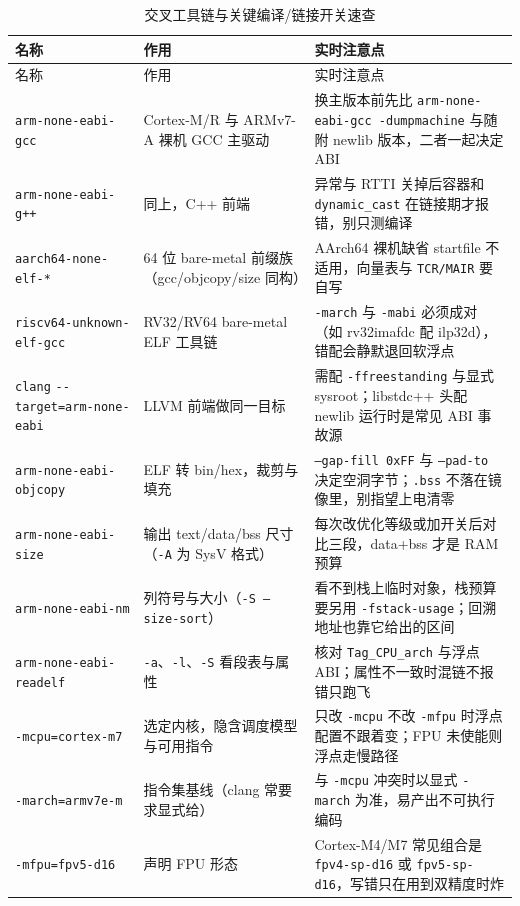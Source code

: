 \documentclass[12pt,a4paper,fontset=fandol]{ctexbook}
\newcommand{\Tp}[1]{\texttt{#1}}
\newcommand{\Opt}[1]{\texttt{-\/-#1}}
\begin{document}
\begin{longtable}{>{\raggedright\arraybackslash\footnotesize}p{} >{\raggedright\arraybackslash\footnotesize}p{} >{\raggedright\arraybackslash\footnotesize}p{}}
\caption{交叉工具链与关键编译/链接开关速查}\label{tab:apB-toolchain} \\
\toprule 名称 & 作用 & 实时注意点 \\ \midrule
\endfirsthead
\toprule 名称 & 作用 & 实时注意点 \\ \midrule
\endhead
\bottomrule \endfoot
\endlastfoot
\Tp{arm-none-eabi-gcc} & Cortex-M/R 与 ARMv7-A 裸机 GCC 主驱动 & 换主版本前先比 \Tp{arm-none-eabi-gcc -dumpmachine} 与随附 newlib 版本，二者一起决定 ABI \\
\Tp{arm-none-eabi-g++} & 同上，C++ 前端 & 异常与 RTTI 关掉后容器和 \Tp{dynamic\_cast} 在链接期才报错，别只测编译 \\
\Tp{aarch64-none-elf-*} & 64 位 bare-metal 前缀族（gcc/objcopy/size 同构） & AArch64 裸机缺省 startfile 不适用，向量表与 \Tp{TCR/MAIR} 要自写 \\
\Tp{riscv64-unknown-elf-gcc} & RV32/RV64 bare-metal ELF 工具链 & \Tp{-march} 与 \Tp{-mabi} 必须成对（如 rv32imafdc 配 ilp32d），错配会静默退回软浮点 \\
\Tp{clang} \Opt{target=arm-none-eabi} & LLVM 前端做同一目标 & 需配 \Tp{-ffreestanding} 与显式 sysroot；libstdc++ 头配 newlib 运行时是常见 ABI 事故源 \\
\Tp{arm-none-eabi-objcopy} & ELF 转 bin/hex，裁剪与填充 & \Tp{--gap-fill 0xFF} 与 \Tp{--pad-to} 决定空洞字节；\Tp{.bss} 不落在镜像里，别指望上电清零 \\
\Tp{arm-none-eabi-size} & 输出 text/data/bss 尺寸（\Tp{-A} 为 SysV 格式） & 每次改优化等级或加开关后对比三段，data+bss 才是 RAM 预算 \\
\Tp{arm-none-eabi-nm} & 列符号与大小（\Tp{-S --size-sort}） & 看不到栈上临时对象，栈预算要另用 \Tp{-fstack-usage}；回溯地址也靠它给出的区间 \\
\Tp{arm-none-eabi-readelf} & \Tp{-a}、\Tp{-l}、\Tp{-S} 看段表与属性 & 核对 \Tp{Tag\_CPU\_arch} 与浮点 ABI；属性不一致时混链不报错只跑飞 \\
\Tp{-mcpu=cortex-m7} & 选定内核，隐含调度模型与可用指令 & 只改 \Tp{-mcpu} 不改 \Tp{-mfpu} 时浮点配置不跟着变；FPU 未使能则浮点走慢路径 \\
\Tp{-march=armv7e-m} & 指令集基线（clang 常要求显式给） & 与 \Tp{-mcpu} 冲突时以显式 \Tp{-march} 为准，易产出不可执行编码 \\
\Tp{-mfpu=fpv5-d16} & 声明 FPU 形态 & Cortex-M4/M7 常见组合是 \Tp{fpv4-sp-d16} 或 \Tp{fpv5-sp-d16}，写错只在用到双精度时炸 \\

\end{longtable}
\end{document}
